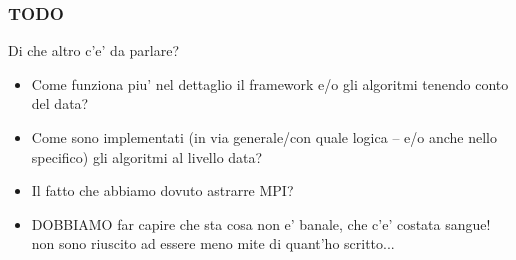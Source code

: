 \subsubsection*{TODO}
Di che altro c'e' da parlare?
\begin{itemize}
	\item{Come funziona piu' nel dettaglio il framework e/o gli algoritmi tenendo conto del data?}
	\item{Come sono implementati (in via generale/con quale logica -- e/o anche nello specifico) gli algoritmi al livello data?}
	\item{Il fatto che abbiamo dovuto astrarre MPI?}
	\item{DOBBIAMO far capire che sta cosa non e' banale, che c'e' costata sangue! non sono riuscito ad essere meno mite di quant'ho scritto...}
\end{itemize}



